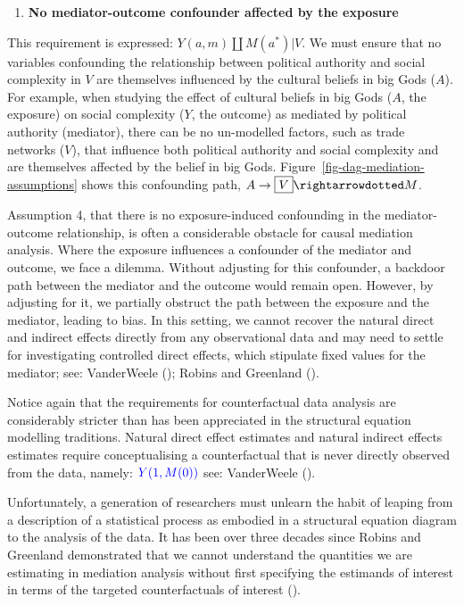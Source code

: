 \documentclass[
  singlecolumn]{article}
\providecommand{\tightlist}{%
  \setlength{\itemsep}{0pt}\setlength{\parskip}{0pt}}\usepackage{longtable,booktabs,array}
\begin{document}
\begin{enumerate}
\def\labelenumi{\arabic{enumi}.}
\setcounter{enumi}{3}
\tightlist
\item
  \textbf{No mediator-outcome confounder affected by the exposure}
\end{enumerate}

This requirement is expressed: \(Y(a,m) \coprod M(a^*) | V\). We must
ensure that no variables confounding the relationship between political
authority and social complexity in \(V\) are themselves influenced by
the cultural beliefs in big Gods (\(A\)). For example, when studying the
effect of cultural beliefs in big Gods (\(A\), the exposure) on social
complexity (\(Y\), the outcome) as mediated by political authority
(mediator), there can be no un-modelled factors, such as trade networks
(\(V\)), that influence both political authority and social complexity
and are themselves affected by the belief in big Gods.
Figure~\ref{fig-dag-mediation-assumptions} shows this confounding path,
\(A\to \boxed{V}\rightarrowdotted M\).

Assumption 4, that there is no exposure-induced confounding in the
mediator-outcome relationship, is often a considerable obstacle for
causal mediation analysis. Where the exposure influences a confounder of
the mediator and outcome, we face a dilemma. Without adjusting for this
confounder, a backdoor path between the mediator and the outcome would
remain open. However, by adjusting for it, we partially obstruct the
path between the exposure and the mediator, leading to bias. In this
setting, we cannot recover the natural direct and indirect effects
directly from any observational data and may need to settle for
investigating controlled direct effects, which stipulate fixed values
for the mediator; see: VanderWeele
(); Robins and Greenland
().

Notice again that the requirements for counterfactual data analysis are
considerably stricter than has been appreciated in the structural
equation modelling traditions. Natural direct effect estimates and
natural indirect effects estimates require conceptualising a
counterfactual that is never directly observed from the data, namely:
\(\textcolor{blue}{Y(1, M(0))}\) see: VanderWeele
().

Unfortunately, a generation of researchers must unlearn the habit of
leaping from a description of a statistical process as embodied in a
structural equation diagram to the analysis of the data. It has been
over three decades since Robins and Greenland demonstrated that we
cannot understand the quantities we are estimating in mediation analysis
without first specifying the estimands of interest in terms of the
targeted counterfactuals of interest ().
\end{document}
